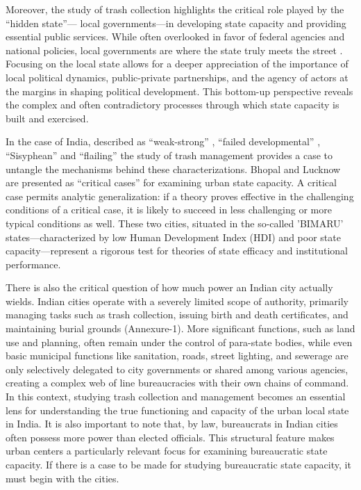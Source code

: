 Moreover, the study of trash collection highlights the critical role played by the ``hidden state''— local governments—in developing state capacity and providing essential public services. While often overlooked in favor of federal agencies and national policies, local governments are where the state truly meets the street \citep{Zacka2017}. Focusing on the local state allows for a deeper appreciation of the importance of local political dynamics, public-private partnerships, and the agency of actors at the margins in shaping political development. This bottom-up perspective reveals the complex and often contradictory processes through which state capacity is built and exercised.

In the case of India, described as ``weak-strong'' \citep{Rudolph1987}, ``failed developmental'' \citep{Herring1999}, ``Sisyphean'' \citep{Kapur2007} and ``flailing'' \citep{Pritchett2009} the study of trash management provides a case to untangle the mechanisms behind these characterizations. Bhopal and Lucknow are presented as ``critical cases'' \citep{Eckstein1975} for examining urban state capacity. A critical case permits analytic generalization: if a theory proves effective in the challenging conditions of a critical case, it is likely to succeed in less challenging or more typical conditions as well. These two cities, situated in the so-called 'BIMARU' states—characterized by low Human Development Index (HDI) and poor state capacity—represent a rigorous test for theories of state efficacy and institutional performance.

There is also the critical question of how much power an Indian city actually wields. Indian cities operate with a severely limited scope of authority, primarily managing tasks such as trash collection, issuing birth and death certificates, and maintaining burial grounds (Annexure-1). More significant functions, such as land use and planning, often remain under the control of para-state bodies, while even basic municipal functions like sanitation, roads, street lighting, and sewerage are only selectively delegated to city governments or shared among various agencies, creating a complex web of line bureaucracies with their own chains of command. In this context, studying trash collection and management becomes an essential lens for understanding the true functioning and capacity of the urban local state in India. It is also important to note that, by law, bureaucrats in Indian cities often possess more power than elected officials. This structural feature makes urban centers a particularly relevant focus for examining bureaucratic state capacity. If there is a case to be made for studying bureaucratic state capacity, it must begin with the cities.

